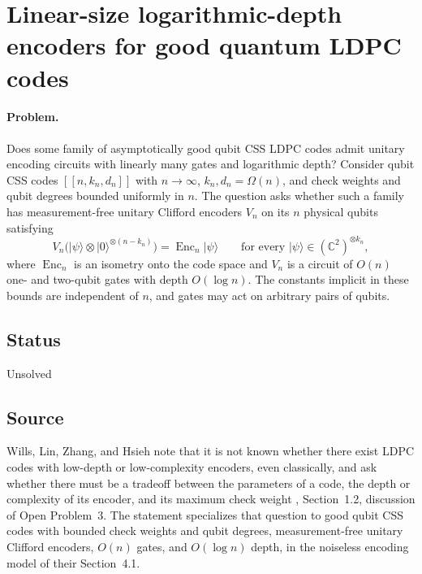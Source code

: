 \section{Linear-size logarithmic-depth encoders for good quantum LDPC codes}
\label{sec:op_62c9d73ced040f87}

\paragraph{Problem.}
Does some family of asymptotically good qubit CSS LDPC codes admit unitary
encoding circuits with linearly many gates and logarithmic depth?  Consider
qubit CSS codes $[[n,k_n,d_n]]$ with $n\to\infty$, $k_n,d_n=\Omega(n)$, and
check weights and qubit degrees bounded uniformly in $n$.  The question asks
whether such a family has measurement-free unitary Clifford encoders $V_n$ on
its $n$ physical qubits satisfying
\begin{equation}
  V_n\bigl(|\psi\rangle\otimes|0\rangle^{\otimes(n-k_n)}\bigr)
  =\operatorname{Enc}_n|\psi\rangle
  \qquad
  \text{for every }|\psi\rangle\in(\mathbb C^2)^{\otimes k_n},
  \label{eq:62c9-encoder}
\end{equation}
where $\operatorname{Enc}_n$ is an isometry onto the code space and $V_n$ is a
circuit of $O(n)$ one- and two-qubit gates with depth $O(\log n)$.  The
constants implicit in these bounds are independent of $n$, and gates may act
on arbitrary pairs of qubits.

\subsection*{Status}

Unsolved

\subsection*{Source}

Wills, Lin, Zhang, and Hsieh note that it is not known whether there exist
LDPC codes with low-depth or low-complexity encoders, even classically, and
ask whether there must be a tradeoff between the parameters of a code, the
depth or complexity of its encoder, and its maximum check weight
, Section~1.2, discussion of Open
Problem~3.  The statement specializes that question to good qubit CSS codes
with bounded check weights and qubit degrees, measurement-free unitary
Clifford encoders, $O(n)$ gates, and $O(\log n)$ depth, in the noiseless
encoding model of their Section~4.1.

